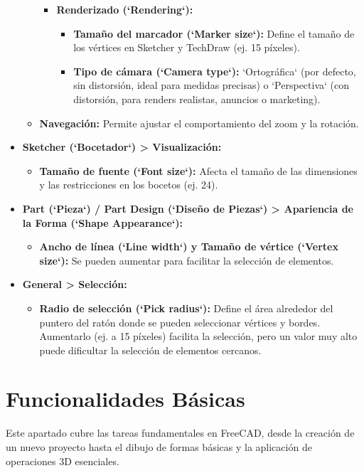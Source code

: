 \documentclass[12pt]{article}
\begin{document}
\begin{itemize}[label=\textbullet]
\begin{itemize}[label=\textendash]
\begin{itemize}[label=\textendash]
            \item \textbf{Renderizado (`Rendering`):}
            \begin{itemize}[label=\textendash]
                \item \textbf{Tamaño del marcador (`Marker size`):} Define el tamaño de los vértices en Sketcher y TechDraw (ej. 15 píxeles).
                \item \textbf{Tipo de cámara (`Camera type`):} `Ortográfica` (por defecto, sin distorsión, ideal para medidas precisas) o `Perspectiva` (con distorsión, para renders realistas, anuncios o marketing).
            \end{itemize}
        \end{itemize}
        \item \textbf{Navegación:} Permite ajustar el comportamiento del zoom y la rotación.
    \end{itemize}
    \item \textbf{Sketcher (`Bocetador`) > Visualización:}
    \begin{itemize}[label=\textendash]
        \item \textbf{Tamaño de fuente (`Font size`):} Afecta el tamaño de las dimensiones y las restricciones en los bocetos (ej. 24).
    \end{itemize}
    \item \textbf{Part (`Pieza`) / Part Design (`Diseño de Piezas`) > Apariencia de la Forma (`Shape Appearance`):}
    \begin{itemize}[label=\textendash]
        \item \textbf{Ancho de línea (`Line width`) y Tamaño de vértice (`Vertex size`):} Se pueden aumentar para facilitar la selección de elementos.
    \end{itemize}
    \item \textbf{General > Selección:}
    \begin{itemize}[label=\textendash]
        \item \textbf{Radio de selección (`Pick radius`):} Define el área alrededor del puntero del ratón donde se pueden seleccionar vértices y bordes. Aumentarlo (ej. a 15 píxeles) facilita la selección, pero un valor muy alto puede dificultar la selección de elementos cercanos.
    \end{itemize}
\end{itemize}
\newpage

\section{Funcionalidades Básicas}
Este apartado cubre las tareas fundamentales en FreeCAD, desde la creación de un nuevo proyecto hasta el dibujo de formas básicas y la aplicación de operaciones 3D esenciales.
\end{document}
